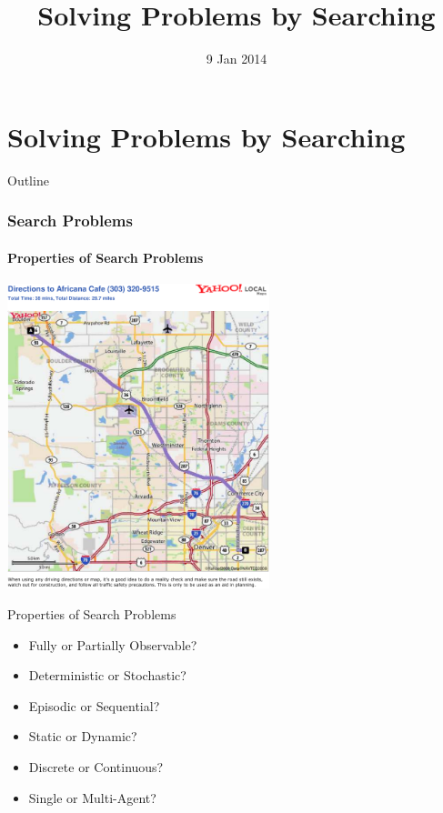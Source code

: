 \documentclass[14pt]{beamer}
\title{Solving Problems by Searching}
\date[]{9 Jan 2014}
\begin{document}
\begin{frame}
  \titlepage
\end{frame}

\part{Solving Problems by Searching}

\begin{frame}{Outline}
	\footnotesize
  \tableofcontents
\end{frame}

\section{Search Problems}

\subsection{Properties of Search Problems}
\begin{frame}[plain]
	\begin{center}
		\includegraphics[width=3in]{cu-to-africana.pdf}
	\end{center}
\end{frame}

\begin{frame}{Properties of Search Problems}
	\begin{itemize}
		\item \alert<2->{Fully} or Partially Observable?
		\item \alert<2->{Deterministic} or Stochastic?
		\item Episodic or \alert<2->{Sequential}?
		\item \alert<2->{Static} or Dynamic?
		\item \alert<2->{Discrete} or Continuous?
		\item \alert<2->{Single} or Multi-Agent?
	\end{itemize}
\end{frame}
\end{document}
